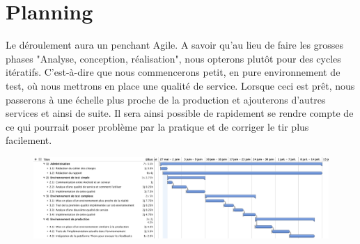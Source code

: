 
\chapter{Planning}
Le déroulement aura un penchant Agile. A savoir qu'au lieu de faire les grosses phases "Analyse, conception, réalisation", nous opterons plutôt pour des cycles itératifs. C'est-à-dire que nous commencerons petit, en pure environnement de test, où nous mettrons en place une qualité de service. Lorsque ceci est prêt, nous passerons à une échelle plus proche de la production et ajouterons d'autres services et ainsi de suite. Il sera ainsi possible de rapidement se rendre compte de ce qui pourrait poser problème par la pratique et de corriger le tir plus facilement.

\begin{figure}[H]
    \begin{center}
        \centering \includegraphics[width=1.5\linewidth, angle=90]{CDC/planning_bachelor_v1}
    \end{center}
\end{figure}
